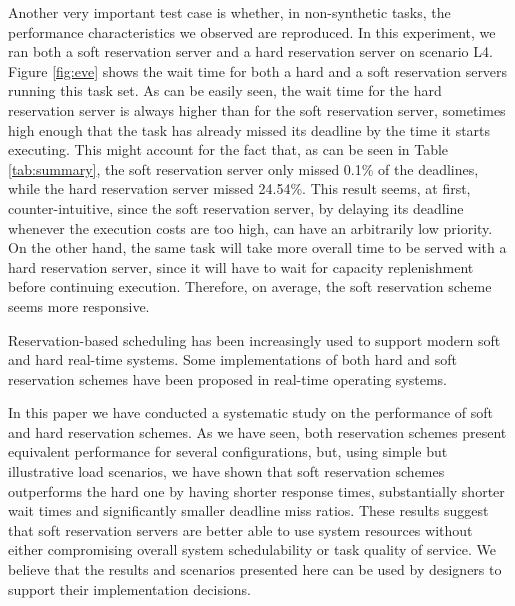 \documentclass[times, 10pt,twocolumn]{article}
\begin{document}
Another very important test case is whether, in non-synthetic tasks,
the performance characteristics we observed are reproduced. In this
experiment, we ran both a soft reservation server and a hard
reservation server on scenario L4. Figure \ref{fig:eve} shows the wait
time for both a hard and a soft reservation servers running this task
set. As can be easily seen, the wait time for the hard reservation
server is always higher than for the soft reservation server,
sometimes high enough that the task has already missed its deadline by
the time it starts executing. This might account for the fact that, as
can be seen in Table \ref{tab:summary}, the soft reservation server
only missed 0.1\% of the deadlines, while the hard reservation server
missed 24.54\%. This result seems, at first, counter-intuitive, since
the soft reservation server, by delaying its deadline whenever the
execution costs are too high, can have an arbitrarily low priority. On
the other hand, the same task will take more overall time to be served
with a hard reservation server, since it will have to wait for
capacity replenishment before continuing execution. Therefore, on
average, the soft reservation scheme seems more responsive.

\label{sec:conclusion}

Reservation-based scheduling has been increasingly used to support
modern soft and hard real-time systems. Some implementations of both
hard and soft reservation schemes have been proposed in real-time
operating systems.

In this paper we have conducted a systematic study on the performance
of soft and hard reservation schemes. As we have seen, both
reservation schemes present equivalent performance for several
configurations, but, using simple but illustrative load scenarios, we
have shown that soft reservation schemes outperforms the hard one by
having shorter response times, substantially shorter wait times and
significantly smaller deadline miss ratios. These results suggest that
soft reservation servers are better able to use system resources
without either compromising overall system schedulability or task
quality of service. We believe that the results and scenarios
presented here can be used by designers to support their 
implementation decisions.



\end{document}
